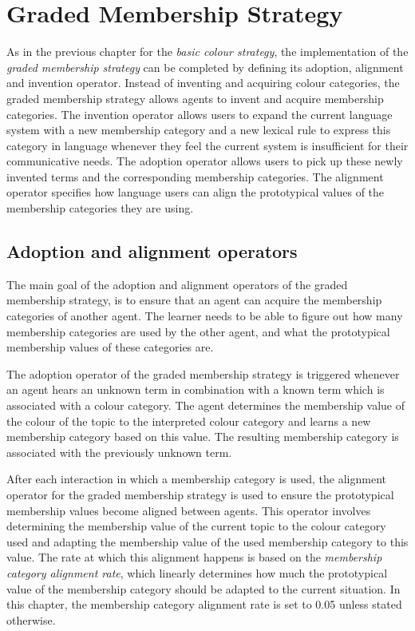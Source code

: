 \chapter{Graded Membership Strategy}
\label{s:graded-operators}

As in the previous chapter for the \emph{basic colour strategy}, the
implementation of the \emph{graded membership strategy} can be
completed by defining its adoption, alignment and invention
operator. Instead of inventing and acquiring colour categories, the
graded membership strategy allows agents to invent and acquire
membership categories. The invention operator allows users to expand
the current language system with a new membership category and a new
lexical rule to express this category in language whenever they feel
the current system is insufficient for their communicative needs. The
adoption operator allows users to pick up these newly invented terms
and the corresponding membership categories. The alignment operator
specifies how language users can align the prototypical values of the
membership categories they are using.

\section{Adoption and alignment operators}

The main goal of the adoption and alignment operators of the graded
membership strategy, is to ensure that an agent can acquire the
membership categories of another agent. The learner needs to be able
to figure out how many membership categories are used by the other
agent, and what the prototypical membership values of these categories
are.

The adoption operator 
of the graded membership strategy is triggered
whenever an agent hears an unknown term in combination with a known
term which is associated with a colour category. The agent determines
the membership value of the colour of the topic to the interpreted colour
category and learns a new membership category based on this 
value. The resulting membership category is associated with the
previously unknown term.

After each interaction in which a membership category is used, the
alignment operator
for the graded membership strategy is
used to ensure the prototypical membership values become aligned between agents. This
operator involves determining the membership value of the current
topic to the colour category used and adapting the membership value of the
used membership category to this value. The rate at which this
alignment happens is based on the \emph{membership category alignment rate},
which linearly
determines how much the prototypical value of the membership category
should be adapted to the current situation. In this chapter, the membership category
alignment rate is set to 0.05 unless stated otherwise.

